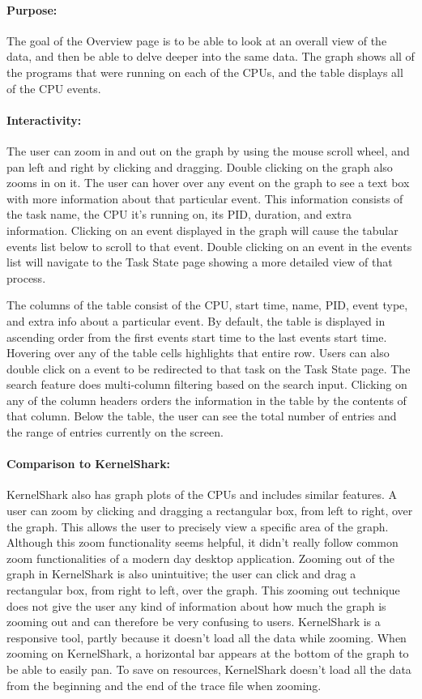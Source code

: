 \documentclass{hmcclinic}
\begin{document}
\paragraph{Purpose:} 
The goal of the Overview page is to be able to look at an overall view
of the data, and then be able to delve deeper into the
same data. The graph shows all of 
the programs that were running on each of the CPUs, and the table displays 
all of the CPU events.

\paragraph{Interactivity:} The user can zoom in and out on the graph by using
the mouse scroll wheel, and pan left and right by clicking and dragging. Double
clicking on the graph also zooms in on it. The user can hover over any event on
the graph to see a text box with more information about that particular event.
This information consists of the task name, the CPU it's running on, its PID,
duration, and extra information. Clicking on an event displayed in the graph
will cause the tabular events list below to scroll to that event. Double
clicking on an event in the events list will navigate to the Task State page
showing a more detailed view of that process.

The columns of the table consist of the CPU, start time, name, PID, event type,
and extra info about a particular event. By default, the table is displayed in
ascending order from the first events start time to the last events start time.
Hovering over any of the table cells highlights that entire row. Users can also
double click on a event to be redirected to that task on the Task State page.
The search feature does multi-column filtering based on the search input.
Clicking on any of the column headers orders the information in the table by the
contents of that column. Below the table, the user can see the total number of
entries and the range of entries currently on the screen.

\paragraph{Comparison to KernelShark:} 
  KernelShark also has graph plots of the CPUs and includes similar features. A
  user can zoom by clicking and dragging a rectangular box, from left to right,
  over the graph.  This allows the user to precisely view a specific area of the
  graph.  Although this zoom functionality seems helpful, it didn't really follow
  common zoom functionalities of a modern day desktop application. Zooming out of
  the graph in KernelShark is also unintuitive; the user can click and drag a
  rectangular box, from right to left, over the graph. This zooming out technique
  does not give the user any kind of information about how much the graph is
  zooming out and can therefore be very confusing to users. KernelShark is a
  responsive tool, partly because it doesn't load all the data while zooming. When
  zooming on KernelShark, a horizontal bar appears at the bottom of the graph to
  be able to easily pan. To save on resources, KernelShark doesn't load all the
  data from the beginning and the end of the trace file when zooming. 
    
\end{document}
